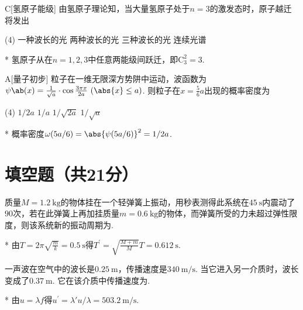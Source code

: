 \begin{choice}{C}[氢原子能级]
    由氢原子理论知，当大量氢原子处于$n=3$的激发态时，原子越迁将发出
    \begin{tasks}(4)
        \task 一种波长的光
        \task 两种波长的光
        \task 三种波长的光
        \task 连续光谱
    \end{tasks}
\end{choice}
\begin{solution}*
    氢原子从在$n=1,2,3$中任意两能级间跃迁，即$\mathrm{C}_3^2=3$. 
\end{solution}

\begin{choice}{A}[量子初步]
    粒子在一维无限深方势阱中运动，波函数为$\psi\ab(x)=\frac{1}{\sqrt{{a}}}\cdot\cos{\frac{3\pi x}{2a}}\ (\abs{x}\leq a)$. 则粒子在$x=\frac56a$出现的概率密度为
    \begin{tasks}(4)
        \task $1/2a$
        \task $1/a$
        \task $1/\sqrt{2a}$
        \task $1/\sqrt{a}$
    \end{tasks}
\end{choice}
\begin{solution}*
    概率密度$\omega(5a/6)=\abs{\psi(5a/6)}^2=1/2a$. 
\end{solution}

\section{填空题（共21分）}
\begin{problem}[弹簧振子][3]
    质量$M=\qty{1.2}{\kg}$的物体挂在一个轻弹簧上振动，用秒表测得此系统在$\qty{45}{\s}$内震动了$90$次，若在此弹簧上再加挂质量$m=\qty{0.6}{\kg}$的物体，而弹簧所受的力未超过弹性限度，则该系统新的振动周期为.
\end{problem}
\begin{solution}*
    由$T=2\pi\sqrt{\frac{m}{k}}=\qty{0.5}{\s}$得$T^{\prime}=\sqrt{\frac{M+m}{M}}T=\qty{0.612}{\s}$.
\end{solution}

\begin{problem}[简谐波][3]
    一声波在空气中的波长是$\qty{0.25}{\m}$，传播速度是$\qty{340}{\m/\s}$. 当它进入另一介质时，波长变成了$\qty{0.37}{\m}$. 它在该介质中传播速度为.
\end{problem}
\begin{solution}*
    由$u=\lambda f$得$u^{\prime}=\lambda'u/\lambda=\qty{503.2}{\m/\s}$.
\end{solution}

